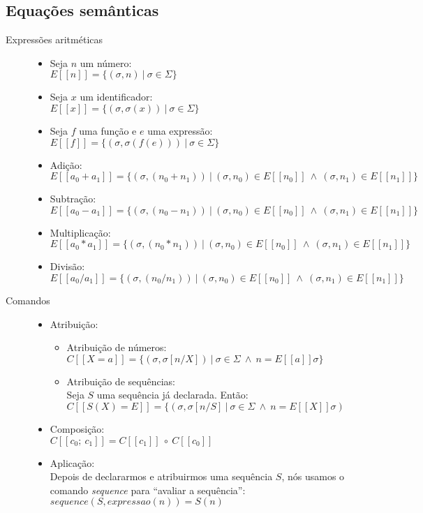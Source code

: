 \documentclass[a4 paper, 12pt]{article}
\begin{document}
\subsection{Equa\c c\~oes sem\^anticas}
\begin{description}
\item[Express\~oes aritm\'eticas]\hfill
  \begin{itemize}
  \item Seja $n$ um n\'umero:\\
    $E[[n]] = \{(\sigma, n)\ |\ \sigma \in \Sigma\}$
  \item Seja $x$ um identificador:\\
    $E[[x]] = \{(\sigma, \sigma (x))\ |\ \sigma \in \Sigma\}$
  \item Seja $f$ uma fun\c c\~ao e $e$ uma express\~ao:\\
    $E[[f]] = \{(\sigma, \sigma (f(e)))\ |\ \sigma \in \Sigma\}$
  \item Adi\c c\~ao:\\
    $E[[a_0 + a_1]] = \{(\sigma, (n_0 + n_1))\ |\ (\sigma, n_0) \in
    E[[n_0]]\ \wedge\ (\sigma, n_1) \in E[[n_1]]\}$
  \item Subtra\c c\~ao:\\
    $E[[a_0 - a_1]] = \{(\sigma, (n_0- n_1))\ |\ (\sigma, n_0) \in
    E[[n_0]]\ \wedge\ (\sigma, n_1) \in E[[n_1]]\}$
  \item Multiplica\c c\~ao:\\
    $E[[a_0 * a_1]] = \{(\sigma, (n_0 * n_1))\ |\ (\sigma, n_0) \in
    E[[n_0]]\ \wedge\ (\sigma, n_1) \in E[[n_1]]\}$
  \item Divis\~ao:\\
    $E[[a_0 / a_1]] = \{(\sigma, (n_0 / n_1))\ |\ (\sigma, n_0) \in
    E[[n_0]]\ \wedge\ (\sigma, n_1) \in E[[n_1]]\}$
  \end{itemize}
\item[Comandos]\hfill
  \begin{itemize}
  \item Atribui\c c\~ao:
    \begin{itemize}
    \item Atribui\c c\~ao de n\'umeros:\\
      $C[[X = a]] = \{(\sigma, \sigma[n / X])\ |\ \sigma \in \Sigma\
      \wedge\ n = E[[a]]\sigma\}$

    \item Atribui\c c\~ao de sequ\^encias:\\
      Seja $S$ uma sequ\^encia j\'a declarada. Ent\~ao:\\
      $C[[S(X) = E]] = \{(\sigma, \sigma[n / S]\ |\ \sigma \in \Sigma\
      \wedge\ n = E[[X]]\sigma)$
    \end{itemize}
  \item Composi\c c\~ao:\\
    $C[[c_0;\ c_1]] = C[[c_1]]\ \circ\ C[[c_0]]$
  \item Aplica\c c\~ao:\\
    Depois de declararmos e atribuirmos uma sequ\^encia $S$, n\'os usamos
    o comando \emph{sequence} para ``avaliar a sequ\^encia'':\\
    $sequence(S, expressao(n)) = S(n)$\\


\end{itemize}
\end{description}
\end{document}
